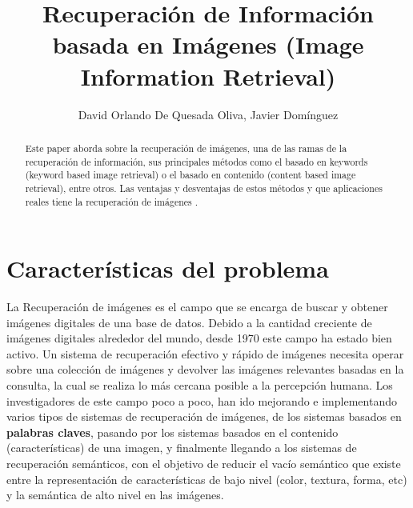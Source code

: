 \documentclass{llncs}
\begin{document}
%
\title{Recuperación de Información basada en Imágenes (Image Information Retrieval)}
\author{David Orlando De Quesada Oliva, Javier Dom\'inguez}
\maketitle

\begin{abstract}
    
    Este paper aborda sobre la recuperaci\'on de im\'agenes, una de las ramas de la
    recuperaci\'on de informaci\'on, sus principales m\'etodos como el basado en keywords
    (keyword based image retrieval) o el basado en contenido (content based image retrieval),
    entre otros. Las ventajas y desventajas de estos m\'etodos y que aplicaciones reales tiene 
    la recuperaci\'on de im\'agenes .

\end{abstract}

\tableofcontents
%

  



\chapter*{Caracter\'isticas del problema}
La Recuperación de im\'agenes es el campo que se encarga de buscar y obtener imágenes 
digitales de una base  de datos. Debido a la cantidad creciente de imágenes digitales 
alrededor del mundo, desde 1970 este campo ha estado bien activo. Un sistema de 
recuperación efectivo y rápido de imágenes necesita operar sobre una colección de 
imágenes y devolver las imágenes relevantes basadas en la consulta, la cual 
se realiza lo más cercana posible a la percepción humana. Los investigadores de este 
campo poco a poco, han ido mejorando e implementando varios tipos de sistemas de recuperación 
de imágenes, de los sistemas basados en \textbf{palabras claves}, pasando por los sistemas 
basados en el contenido (características) de una imagen, y finalmente llegando a los 
sistemas de recuperación semánticos, con el objetivo de reducir el vacío semántico que 
existe entre la representación de características de bajo nivel (color, textura, forma, etc) y 
la semántica de alto nivel en las imágenes.
\end{document}
